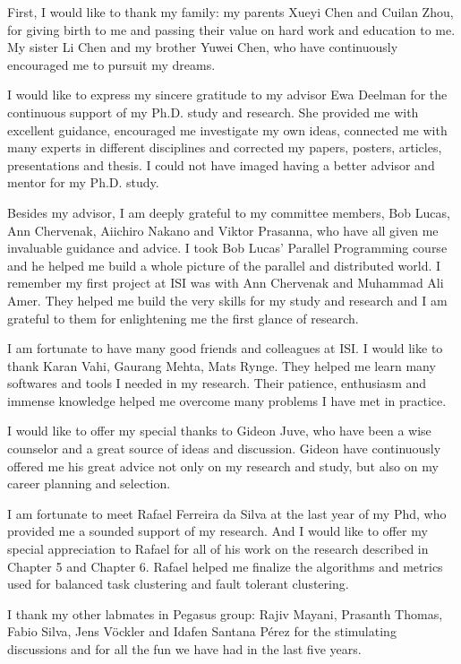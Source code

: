 
First, I would like to thank my family: my parents Xueyi Chen and Cuilan Zhou, for giving birth to me and passing their value on hard work and education to me. My sister Li Chen and my brother Yuwei Chen, who have continuously encouraged me to pursuit my dreams. 

I would like to express my sincere gratitude to my advisor Ewa Deelman for the continuous support of my Ph.D. study and research. She provided me with excellent guidance, encouraged me investigate my own ideas, connected me with many experts in different disciplines and corrected my papers, posters, articles, presentations and thesis. I could not have imaged having a better advisor and mentor for my Ph.D. study. 

Besides my advisor, I am deeply grateful to my committee members, Bob Lucas, Ann Chervenak, Aiichiro Nakano and Viktor Prasanna, who have all given me invaluable guidance and advice. I took Bob Lucas' Parallel Programming course and he helped me build a whole picture of the parallel and distributed world. I remember my first project at ISI was with Ann Chervenak and Muhammad Ali Amer. They helped me build the very skills for my study and research and I am grateful to them for enlightening me the first glance of research.

I am fortunate to have many good friends and colleagues at ISI. I would like to thank Karan Vahi, Gaurang Mehta, Mats Rynge. They helped me learn many softwares and tools I needed in my research. Their patience, enthusiasm and immense knowledge helped me overcome many problems I have met in practice. 

I would like to offer my special thanks to Gideon Juve, who have been a wise counselor and a great source of ideas and discussion.  Gideon have continuously offered me his great advice not only on my research and study, but also on my career planning and selection. 

I am fortunate to meet Rafael Ferreira da Silva at the last year of my Phd, who provided me a sounded support of my research. 
And I would like to offer my special appreciation to Rafael for all of his work on the research described in Chapter 5 and Chapter 6. Rafael helped me finalize the algorithms and metrics used for balanced task clustering and fault tolerant clustering. 

I thank my other labmates in Pegasus group: Rajiv Mayani, Prasanth Thomas, Fabio Silva, Jens V\"{o}ckler and Idafen Santana P\'{e}rez for the stimulating discussions and for all the fun we have had in the last five years. 

